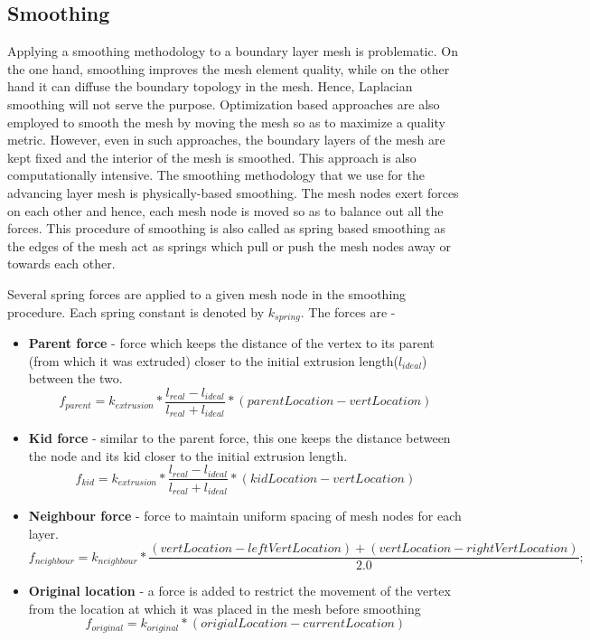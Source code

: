 \documentclass[conf]{new-aiaa}
\begin{document}
\subsection{Smoothing}

Applying a smoothing methodology to a boundary layer mesh is problematic. On the one hand, smoothing improves the mesh element quality, while on the other hand it can diffuse the boundary topology in the mesh. Hence, Laplacian smoothing will not serve the purpose. Optimization based approaches are also employed to smooth the mesh by moving the mesh so as to maximize a quality metric\cite{canann1998approach}. However, even in such approaches, the boundary layers of the mesh are kept fixed and the interior of the mesh is smoothed. This approach is also computationally intensive. The smoothing methodology that we use for the advancing layer mesh is physically-based smoothing. The mesh nodes exert forces on each other and hence, each mesh node is moved so as to balance out all the forces. This procedure of smoothing is also called as spring based smoothing as the edges of the mesh act as springs which pull or push the mesh nodes away or towards each other.

Several spring forces are applied to a given mesh node in the smoothing procedure. Each spring constant is denoted by $k_{spring}$. The forces are -

\begin{itemize}
\item \textbf{Parent force} - force which keeps the distance of the vertex to its parent (from which it was extruded) closer to the initial extrusion length($l_{ideal}$) between the two.
\begin{equation}
f_{parent} = k_{extrusion} * \frac{l_{real} - l_{ideal}}{l_{real} + l_{ideal}} * (parentLocation - vertLocation)
\end{equation}
\item \textbf{Kid force} - similar to the parent force, this one keeps the distance between the node and its kid closer to the initial extrusion length.
\begin{equation}
f_{kid} = k_{extrusion} * \frac{l_{real} - l_{ideal}}{l_{real} + l_{ideal}} * (kidLocation - vertLocation)
\end{equation}
\item \textbf{Neighbour force} - force to maintain uniform spacing of mesh nodes for each layer.
\begin{equation}
f_{neighbour} = k_{neighbour} * \frac{(vertLocation - leftVertLocation) + (vertLocation - rightVertLocation)}{ 2.0};
\end{equation}
\item \textbf{Original location} - a force is added to restrict the movement of the vertex from the location at which it was placed in the mesh before smoothing
\begin{equation}
f_{original} = k_{original} * (origialLocation - currentLocation)
\end{equation}
\end{itemize}
\end{document}
